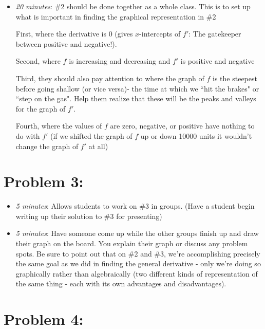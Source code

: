 \documentclass[handout,nooutcomes]{ximera}
\begin{document}
	\begin{itemize}
	
	\item  \emph{20 minutes}:  \#2 should be done together as a whole class.  This is to set up what is important in finding the graphical representation in \#2

First, where the derivative is 0 (gives $x$-intercepts of $f'$:  The gatekeeper between positive and negative!).  

Second, where $f$ is increasing and decreasing and $f'$ is positive and negative

Third, they should also pay attention to where the graph of $f$ is the steepest before going shallow (or vice versa)- the time at which we ``hit the brakes" or ``step on the gas".  Help them realize that these will be the peaks and valleys for the graph of $f'$.

Fourth, where the values of $f$ are zero, negative, or positive have nothing to do with $f'$ (if we shifted the graph of $f$ up or down 10000 units it wouldn't change the graph of $f'$ at all)
	
	\end{itemize}
	


\section*{Problem 3:}

	\begin{itemize}
	
	\item \emph{5 minutes}:  Allows students to work on \#3 in groups. (Have a student begin writing up their solution to \#3 for presenting) 
	
	\item \emph{5 minutes}:  Have someone come up while the other groups finish up and draw their graph on the board.  You explain their graph or discuss any problem spots.  Be sure to point out that on \#2 and \#3, we're accomplishing precisely the same goal as we did in finding the general derivative - only we're doing so graphically rather than algebraically (two different kinds of representation of the same thing - each with its own advantages and disadvantages).	
	\end{itemize}	
	
	
	
\section*{Problem 4:}
\end{document}
